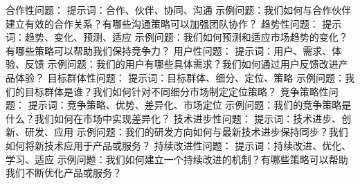 \documentclass[12pt]{book}
\begin{document}
合作性问题：
提示词：合作、伙伴、协同、沟通
示例问题：我们如何与合作伙伴建立有效的合作关系？有哪些沟通策略可以加强团队协作？
趋势性问题：
提示词：趋势、变化、预测、适应
示例问题：我们如何预测和适应市场趋势的变化？有哪些策略可以帮助我们保持竞争力？
用户性问题：
提示词：用户、需求、体验、反馈
示例问题：我们的用户有哪些具体需求？我们如何通过用户反馈改进产品体验？
目标群体性问题：
提示词：目标群体、细分、定位、策略
示例问题：我们的目标群体是谁？我们如何针对不同细分市场制定定位策略？
竞争策略性问题：
提示词：竞争策略、优势、差异化、市场定位
示例问题：我们的竞争策略是什么？我们如何在市场中实现差异化？
技术进步性问题：
提示词：技术进步、创新、研发、应用
示例问题：我们的研发方向如何与最新技术进步保持同步？我们如何将新技术应用于产品或服务？
持续改进性问题：
提示词：持续改进、优化、学习、适应
示例问题：我们如何建立一个持续改进的机制？有哪些策略可以帮助我们不断优化产品或服务？
\end{document}
